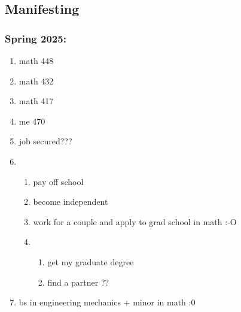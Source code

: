 \documentclass[12pt]{article}
\theoremstyle{definition} %
\theoremstyle{plain} %
\begin{document}
   \subsection{Manifesting}
   \subsubsection{Spring 2025:}
   \begin{enumerate}
    \item math 448
    \item math 432
    \item math 417
    \item me 470
    \item job secured???
    \item \begin{enumerate}
        \item pay off school
        \item become independent
        \item work for a couple and apply to grad school in math :‑O
        \item \begin{enumerate}
            \item get my graduate degree
            \item find a partner ??
        \end{enumerate}
    \end{enumerate}
    \item bs in engineering mechanics + minor in math :0
   \end{enumerate}
\end{document}
